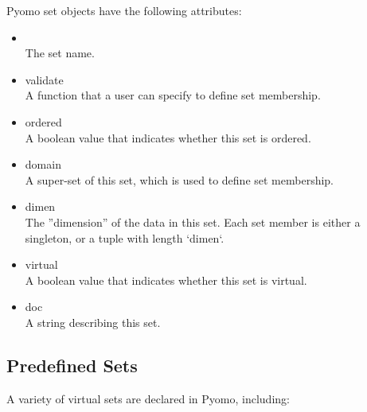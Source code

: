 Pyomo set objects have the following attributes:

\begin{itemize}

\item {}\\
    The set name.

\item validate\\
    A function that a user can specify to define set membership.

\item ordered\\
    A boolean value that indicates whether this set is ordered.

\item domain\\
    A super-set of this set, which is used to define set membership.

\item dimen\\
    The ''dimension'' of the data in this set.  Each set member is either a singleton, or a tuple with length `dimen`.

\item virtual\\
    A boolean value that indicates whether this set is virtual.

\item doc\\
    A string describing this set.
\end{itemize}



\subsection{Predefined Sets}

A variety of virtual sets are declared in Pyomo, including:

